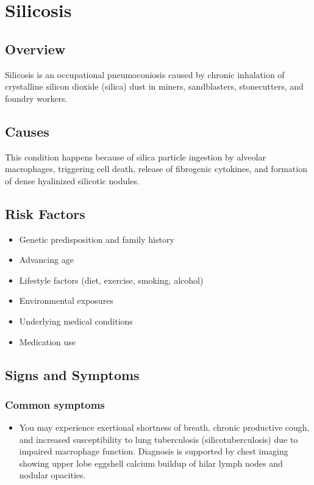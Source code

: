 \chapter{Silicosis}
\label{sec:Silicosis}

\section{Overview}
Silicosis is an occupational pneumoconiosis caused by chronic inhalation of crystalline silicon dioxide (silica) dust in miners, sandblasters, stonecutters, and foundry workers.
\section{Causes}
This condition happens because of silica particle ingestion by alveolar macrophages, triggering cell death, release of fibrogenic cytokines, and formation of dense hyalinized silicotic nodules.     
\section{Risk Factors}

\begin{itemize}[noitemsep]
  \item Genetic predisposition and family history
  \item Advancing age
  \item Lifestyle factors (diet, exercise, smoking, alcohol)
  \item Environmental exposures
  \item Underlying medical conditions
  \item Medication use
\end{itemize}
\section{Signs and Symptoms}

\subsection{Common symptoms}
\begin{itemize}[noitemsep]
  \item You may experience exertional shortness of breath, chronic productive cough, and increased susceptibility to lung tuberculosis (silicotuberculosis) due to impaired macrophage function. Diagnosis is supported by chest imaging showing upper lobe eggshell calcium buildup of hilar lymph nodes and nodular opacities. 
  \end{itemize}

